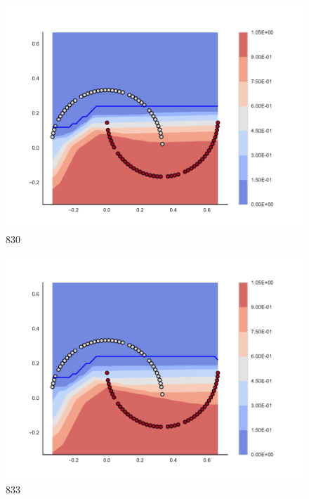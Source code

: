 \begin{subfigure}[b]{0.09\textwidth}
    \includegraphics[clip, trim=2.35cm 1.75cm 4.5cm 0cm,width=\textwidth]{img/convergence/830.pdf}
    \caption{830}
    \label{fig:convergence_830}
\end{subfigure}
%
\begin{subfigure}[b]{0.09\textwidth}
    \includegraphics[clip, trim=2.35cm 1.75cm 4.5cm 0cm,width=\textwidth]{img/convergence/833.pdf}
    \caption{833}
    \label{fig:convergence_833}
\end{subfigure}
%
